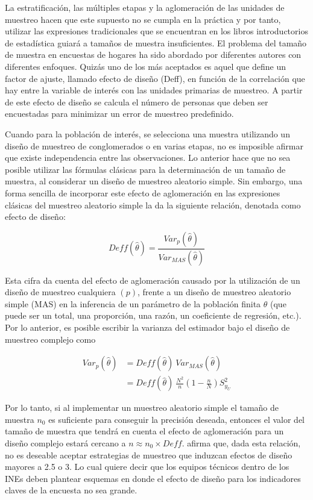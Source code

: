 \documentclass[
  10pt,
  spanish,
]{book}
\begin{document}
La estratificación, las múltiples etapas y la aglomeración de las unidades de muestreo hacen que este supuesto no se cumpla en la práctica y por tanto, utilizar las expresiones tradicionales que se encuentran en los libros introductorios de estadística guiará a tamaños de muestra insuficientes. El problema del tamaño de muestra en encuestas de hogares ha sido abordado por diferentes autores con diferentes enfoques. Quizás uno de los más aceptados es aquel que define un factor de ajuste, llamado efecto de diseño (Deff), en función de la correlación que hay entre la variable de interés con las unidades primarias de muestreo. A partir de este efecto de diseño se calcula el número de personas que deben ser encuestadas para minimizar un error de muestreo predefinido.

Cuando para la población de interés, se selecciona una muestra utilizando un diseño de muestreo de conglomerados o en varias etapas, no es imposible afirmar que existe independencia entre las observaciones. Lo anterior hace que no sea posible utilizar las fórmulas clásicas para la determinación de un tamaño de muestra, al considerar un diseño de muestreo aleatorio simple. Sin embargo, una forma sencilla de incorporar este efecto de aglomeración en las expresiones clásicas del muestreo aleatorio simple la da la siguiente relación, denotada como efecto de diseño:

\begin{equation}
Deff(\hat{\theta})=\frac{Var_p(\hat{\theta})}{Var_{MAS}(\hat{\theta})}
\end{equation}

Esta cifra da cuenta del efecto de aglomeración causado por la utilización de un diseño de muestreo cualquiera \((p)\), frente a un diseño de muestreo aleatorio simple (MAS) en la inferencia de un parámetro de la población finita \(\theta\) (que puede ser un total, una proporción, una razón, un coeficiente de regresión, etc.). Por lo anterior, es posible escribir la varianza del estimador bajo el diseño de muestreo complejo como

\begin{align}
Var_p(\hat{\theta}) & = Deff(\hat{\theta}) \ Var_{MAS}(\hat{\theta}) \\
& = Deff(\hat{\theta}) \ \frac{N^2}{n}\left(1-\frac{n}{N}\right)S^2_{y_U}
\end{align}

Por lo tanto, si al implementar un muestreo aleatorio simple el tamaño de muestra \(n_0\) es suficiente para conseguir la precisión deseada, entonces el valor del tamaño de muestra que tendrá en cuenta el efecto de aglomeración para un diseño complejo estará cercano a \(n \approx n_0 \times Deff\). \citet{United_Nations_2008} afirma que, dada esta relación, no es deseable aceptar estrategias de muestreo que induzcan efectos de diseño mayores a 2.5 o 3. Lo cual quiere decir que los equipos técnicos dentro de los INEs deben plantear esquemas en donde el efecto de diseño para los indicadores claves de la encuesta no sea grande.
\end{document}
